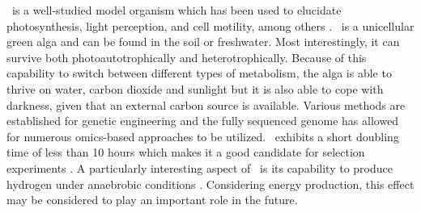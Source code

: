 \chlre~is a well-studied model organism which has been used to elucidate 
photosynthesis, light perception, and cell motility, among others 
\citep{Harris2001}.
\cre~is a unicellular green alga and can be found in the soil or freshwater.
Most interestingly, it can survive both photoautotrophically and 
heterotrophically.
Because of this capability to switch between different types of metabolism, 
the alga is able to thrive on water, carbon dioxide and sunlight but it is
also able to cope with darkness, given that an external carbon source is 
available.
Various methods are established for genetic engineering and the fully sequenced 
genome \citep{Merchant2007} has allowed for numerous omics-based approaches to 
be utilized.
\cre~exhibits a short doubling time of less than 10 hours which makes it 
a good candidate for selection experiments \citep{Dent2001}.
A particularly interesting aspect of \cre~is its capability to produce
hydrogen under anaebrobic conditions \citep{Greenbaum1982}.
Considering energy production, this effect may be considered to play an 
important role in the future.

% 
% 
% 
